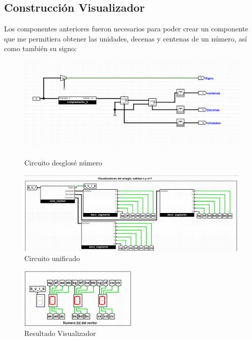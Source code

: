 \documentclass{article}
\begin{document}
\subsection{Construcción Visualizador}
Los componentes anteriores fueron necesarios para poder crear un componente que me permitiera obtener 
las unidades, decenas y centenas de un número, así como también su signo:
\newpage
\begin{figure}[h]
    \centering
    \begin{minipage}{0.45\textwidth} %
      \centering
      \includegraphics[width=\linewidth]{imagenes/view_number.png} %
      \caption{Circuito desglosé número}
      \label{fig:viewnumber}
    \end{minipage}
    \hfill
    \begin{minipage}{0.45\textwidth} %
      \centering
      \includegraphics[width=\linewidth]{imagenes/view_number_selector.png} %
      \caption{Circuito unificado}
      \label{fig:viewnumberunificado}
    \end{minipage}
\end{figure}
\begin{figure}[h] %
    \centering
    \includegraphics[width=0.5\textwidth]{imagenes/view_number_full.png} %
    \caption{Resultado Visualizador} %
    \label{fig:visualizadorfull} %
\end{figure}
\end{document}
